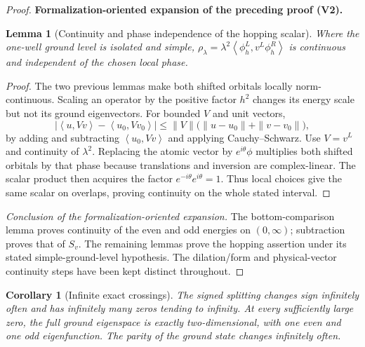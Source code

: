 \documentclass[11pt]{article}
\newtheorem{lemma}[theorem]{Lemma}
\newtheorem{corollary}[theorem]{Corollary}
\newcommand{\formalisationparentid}{X}
\newenvironment{formalisationaddition}[1]{\par\medskip\begingroup\color{blue}\def\formalisationparentid{#1}\setcounter{formalizationsublemma}{0}\let\lemma\formalizationsublemma\let\endlemma\endformalizationsublemma
  \def\Eo{\mathcal E_h^\circ}\def\EE{\mathcal E_h}\def\phio{\phi_h^\circ}\def\phih{\phi_h}\def\Ho{H_h^{\rm atom}(v^\circ)}\def\Ha{H_h^{\rm atom}}\def\HL{H_h^{L}}\def\Dh{D_h}\def\Log{\operatorname{Log}}\def\ellh{\ell_h}\def\Gp{G_{p,h}}\def\Ast{A_{*,h}}\def\ahat{\widehat{\mathfrak a}_h}\def\ah{\mathfrak a_h}\def\rh{\widehat\rho_h}\def\deltah{\widehat\delta_h}\def\oldref##1{\textup{(##1)}}\def\interface##1{\par\noindent\textit{Analytical interface used here.} ##1\par}\def\finish{\par\noindent\textit{Conclusion of the formalization-oriented expansion.} }\par\noindent\textbf{Formalization-oriented expansion of the preceding proof (V2).}\par\smallskip
}{\par\endgroup\medskip
}
\newcommand{\ip}[2]{\left\langle #1,#2\right\rangle}
\begin{document}
\begin{proof}
\begin{formalisationaddition}{L8.6}
\begin{lemma}[Continuity and phase independence of the hopping scalar]\label{sublemma:L8-6-hopping}
Where the one-well ground level is isolated and simple,
$\rho_\lambda=\lambda^2\ip{\phi_h^L}{v^L\phi_h^R}$ is continuous
and independent of the chosen local phase.
\end{lemma}
\begin{proof}
The two previous lemmas make both shifted orbitals locally
norm-continuous. Scaling an operator by the positive factor $h^2$
changes its energy scale but not its ground eigenvectors.
For bounded $V$ and unit vectors,
\[
 |\ip u{Vv}-\ip{u_0}{Vv_0}|
 \le\|V\|\bigl(\|u-u_0\|+\|v-v_0\|\bigr),
\]
by adding and subtracting $\ip{u_0}{Vv}$ and applying
Cauchy--Schwarz. Use $V=v^L$ and continuity of $\lambda^2$.
Replacing the atomic vector by $e^{i\theta}\phi$ multiplies both
shifted orbitals by that phase because translations and inversion are
complex-linear. The scalar product then acquires the factor
$e^{-i\theta}e^{i\theta}=1$. Thus local choices give the same scalar
on overlaps, proving continuity on the whole stated interval.
\end{proof}
\finish The bottom-comparison lemma proves continuity of the even and
odd energies on $(0,\infty)$; subtraction proves that of $S_v$.
The remaining lemmas prove the hopping assertion under its stated
simple-ground-level hypothesis. The dilation/form and physical-vector
continuity steps have been kept distinct throughout.
\end{formalisationaddition}

\end{proof}

\begin{corollary}[Infinite exact crossings]
\label{cor:infinite-crossings}
The signed splitting changes sign infinitely often and
has infinitely many zeros tending to infinity.  At every sufficiently large
zero, the full ground eigenspace is exactly two-dimensional, with one even and
one odd eigenfunction.  The parity of the ground state changes infinitely
often.
\end{corollary}
\end{document}

